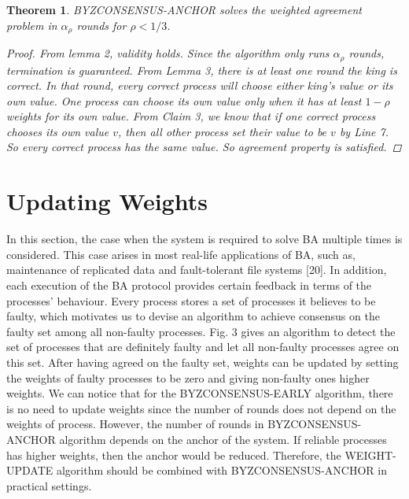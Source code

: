 \documentclass[conference]{IEEEtran}
\newtheorem{t1}{Theorem}
\begin{document}
\begin{t1}
BYZCONSENSUS-ANCHOR solves the weighted agreement problem in $\alpha_\rho$ rounds for $\rho < 1/3$.
\begin{proof}
From lemma 2, validity holds. Since the algorithm only runs $\alpha_\rho$ rounds, termination is guaranteed. From Lemma 3, there is at least one round the king is correct. In that round, every correct process will choose either king's value or its own value. One process can choose its own value only when it has at least $1 - \rho$ weights for its own value. From Claim 3,  we know that if one correct process chooses its own value $v$,  then all other process set their value to be $v$ by Line 7. So every correct process has the same value. So agreement property is satisfied. 
\end{proof}
\end{t1}

\section{Updating Weights}
In this section, the case when the system is required to solve
BA multiple times is considered. This case arises in most real-life applications of BA, such as, maintenance of replicated data
and fault-tolerant file systems [20]. In addition, each execution
of the BA protocol provides certain feedback in terms of the
processes’ behaviour. Every process stores a set of processes it believes to be faulty, which motivates us to devise an algorithm to achieve consensus on the faulty set among all non-faulty processes. Fig. 3 gives an algorithm to detect the set of processes that are definitely faulty and let all non-faulty processes agree on this set. After having agreed on the faulty set, weights can be updated by setting the weights of faulty processes to be zero and giving non-faulty ones higher weights. We can notice that for the BYZCONSENSUS-EARLY algorithm, there is no need to update weights since the number of rounds does not depend on the weights of process. However, the number of rounds in BYZCONSENSUS-ANCHOR algorithm depends on the anchor of the system. If reliable processes has higher weights, then the anchor would be reduced. Therefore, the WEIGHT-UPDATE algorithm should be combined with BYZCONSENSUS-ANCHOR in practical settings.
\end{document}
